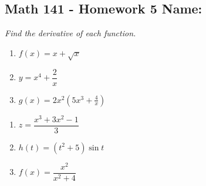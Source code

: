 \documentclass[11pt]{article}
\newcommand{\ds}{\displaystyle}
\begin{document}
\pagestyle{empty}
\subsection*{Math 141 - Homework 5 \hfill Name: \underline{\hspace*{2in}}}

\textit{Find the derivative of each function.}
\begin{multicols}{3}
\begin{enumerate}
\item $f(x) = x + \sqrt{x}$
\item $y = x^4 + \dfrac{2}{x}$
\item $\ds g(x) = 2x^2\left(5x^3 + \frac{4}{x} \right)$
\setcounter{enumCount}{\theenumi}
\end{enumerate}
\end{multicols}
\vfill

\noindent
\begin{multicols}{3}
\begin{enumerate}
\setcounter{enumi}{\theenumCount}
\item $z = \dfrac{x^3 + 3x^2 - 1}{3}$
\item $h(t) = (t^2 + 5) \sin t$
\item $f(x) = \dfrac{x^2}{x^2 + 4}$
\setcounter{enumCount}{\theenumi}
\end{enumerate}
\end{multicols}
\vfill
\end{document}
